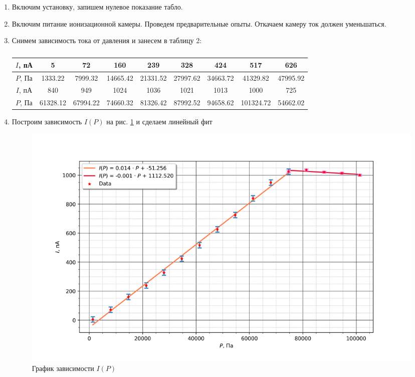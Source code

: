 \documentclass[a4paper]{article}
\begin{document}
\begin{enumerate}
    \item Включим установку, запишем нулевое показание табло.


    \item Включим питание ионизационной камеры. Проведем предварительные опыты. Откачаем камеру ток должен уменьшаться.
    
    
    \item Снимем зависимость тока от давления и занесем в таблицу 2:

    \begin{table}[h]
        \centering
        \caption{}
        \label{t1}
        \begin{tabular}{|c||c|c|c|c|c|c|c|c|}
            \hline
            $I$, пА&5& 72& 160& 239& 328 &424& 517& 626  \\ \hline
            $P$, Па &1333.22& 7999.32& 14665.42& 21331.52& 27997.62& 34663.72& 41329.82& 47995.92 \\ \hline
            \hline
            $I$, пА&840& 949& 1024& 1036& 1021& 1013& 1000&725 \\ \hline
            $P$, Па& 61328.12& 67994.22& 74660.32& 81326.42& 87992.52& 94658.62& 101324.72& 54662.02 \\ \hline
        \end{tabular}
    \end{table}


    \item Построим зависимость $I(P)$ на рис. \ref{gr2} и сделаем линейный фит

    \begin{figure}[H]
        \begin{center}
        \includegraphics[scale = 0.8]{gr2.png}
        \caption{График зависимости $ I(P)$}
        \label{gr2}
        \end{center}
    \end{figure}


\end{enumerate}
\end{document}
